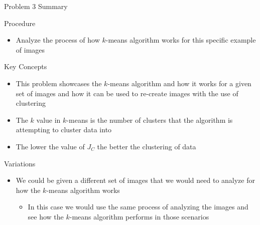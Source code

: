 \begin{summary}{Problem 3 Summary}
    \begin{statement}{Procedure}
        \begin{itemize}
            \item Analyze the process of how $k$-means algorithm works for this specific example of images
        \end{itemize}
    \end{statement}
    \begin{statement}{Key Concepts}
        \begin{itemize}
            \item This problem showcases the $k$-means algorithm and how it works for a given set of images and how it can be used to re-create images with the use of clustering
            \item The $k$ value in $k$-means is the number of clusters that the algorithm is attempting to cluster data into
            \item The lower the value of $J_{C}$ the better the clustering of data
        \end{itemize}
    \end{statement}
    \begin{statement}{Variations}
        \begin{itemize}
            \item We could be given a different set of images that we would need to analyze for how the $k$-means algorithm works
            \begin{itemize}
                \item In this case we would use the same process of analyzing the images and see how the $k$-means algorithm performs in those scenarios
            \end{itemize}
        \end{itemize}
    \end{statement}
\end{summary}

